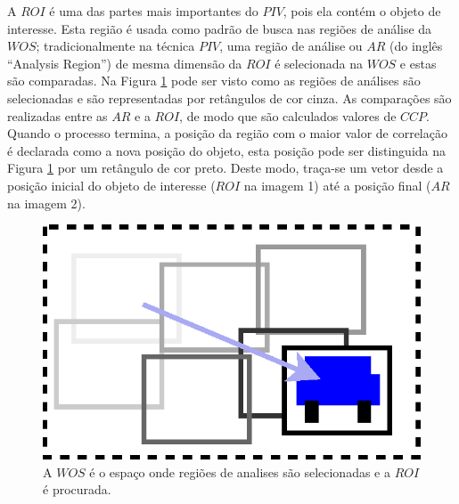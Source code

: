 A $ROI$ é uma das partes mais importantes do $PIV$, pois ela contém o objeto de interesse. 
Esta região é usada como padrão de busca nas regiões de análise da $WOS$;
tradicionalmente na técnica $PIV$, uma região de análise ou $AR$ (do inglês ``Analysis Region'') de mesma dimensão 
da $ROI$ é selecionada na $WOS$ e estas são comparadas.
Na Figura \ref{fig:WOSdivided} pode ser visto como as regiões 
de análises são selecionadas e são representadas por retângulos de cor cinza.
As comparações são realizadas entre as $AR$ e a $ROI$, de modo que são 
calculados valores de $CCP$. Quando o processo termina, a posição da região com o maior valor
de correlação é declarada como a nova posição do objeto, esta posição pode ser distinguida na Figura \ref{fig:WOSdivided}
por um retângulo de cor preto. Deste modo, traça-se um vetor desde a posição inicial do objeto 
de interesse ($ROI$ na imagem 1) até a posição final ($AR$ na imagem 2).
\begin{figure}[H]
\includegraphics[width=0.8\columnwidth]{images/WOSdivided.eps}
\caption{A $WOS$ é o espaço onde regiões de analises são selecionadas e a $ROI$ é procurada.}
\label{fig:WOSdivided}
\end{figure}
